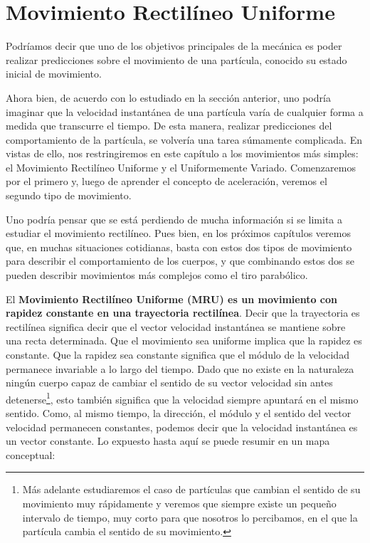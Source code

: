 \section{Movimiento Rectilíneo Uniforme}

Podríamos decir que uno de los objetivos principales de la mecánica es poder realizar predicciones sobre el movimiento de una partícula, conocido su estado inicial de movimiento.

Ahora bien, de acuerdo con lo estudiado en la sección anterior, uno podría imaginar que la velocidad instantánea de una partícula varía de cualquier forma a medida que transcurre el tiempo. De esta manera, realizar predicciones del comportamiento de la partícula, se volvería una tarea súmamente complicada. En vistas de ello, nos restringiremos en este capítulo a los movimientos más simples: el Movimiento Rectilíneo Uniforme y el Uniformemente Variado. Comenzaremos por el primero y, luego de aprender el concepto de aceleración, veremos el segundo tipo de movimiento.

Uno podría pensar que se está perdiendo de mucha información si se limita a estudiar el movimiento rectilíneo. Pues bien, en los próximos capítulos veremos que, en muchas situaciones cotidianas, basta con estos dos tipos de movimiento para describir el comportamiento de los cuerpos, y que combinando estos dos se pueden describir movimientos más complejos como el tiro parabólico.

El {\bf Movimiento Rectilíneo Uniforme (MRU) es un movimiento con rapidez constante en una trayectoria rectilínea}. Decir que la trayectoria es rectilínea significa decir que el vector velocidad instantánea se mantiene sobre una recta determinada. Que el movimiento sea uniforme implica que la rapidez es constante. Que la rapidez sea constante significa que el módulo de la velocidad permanece invariable a lo largo del tiempo. Dado que no existe en la naturaleza ningún cuerpo capaz de cambiar el sentido de su vector velocidad sin antes detenerse\footnote{Más adelante estudiaremos el caso de partículas que cambian el sentido de su movimiento muy rápidamente y veremos que siempre existe un pequeño intervalo de tiempo, muy corto para que nosotros lo percibamos, en el que la partícula cambia el sentido de su movimiento.}, esto también significa que la velocidad siempre apuntará en el mismo sentido. Como, al mismo tiempo, la dirección, el módulo y el sentido del vector velocidad permanecen constantes, podemos decir que la velocidad instantánea es un vector constante. Lo expuesto hasta aquí se puede resumir en un mapa conceptual:

